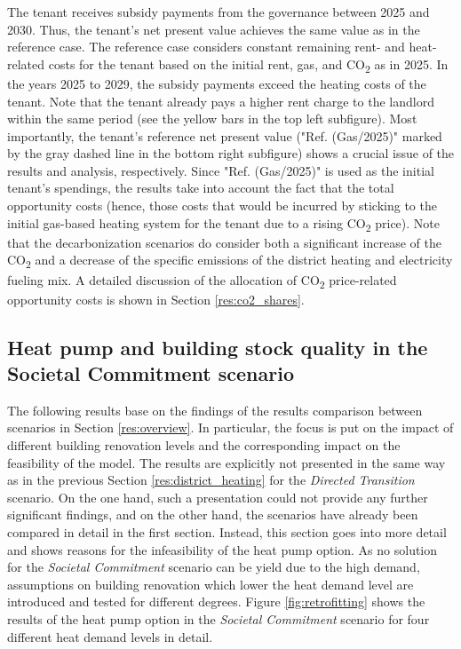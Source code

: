  The tenant receives subsidy payments from the governance between 2025 and 2030. Thus, the tenant's net present value achieves the same value as in the reference case. The reference case considers constant remaining rent- and heat-related costs for the tenant based on the initial rent, gas, and CO\textsubscript{2} as in 2025. In the years 2025 to 2029, the subsidy payments exceed the heating costs of the tenant. Note that the tenant already pays a higher rent charge to the landlord within the same period (see the yellow bars in the top left subfigure). Most importantly, the tenant's reference net present value ("Ref. (Gas/2025)" marked by the gray dashed line in the bottom right subfigure) shows a crucial issue of the results and analysis, respectively. Since "Ref. (Gas/2025)" is used as the initial tenant's spendings, the results take into account the fact that the total opportunity costs (hence, those costs that would be incurred by sticking to the initial gas-based heating system for the tenant due to a rising CO\textsubscript{2} price). Note that the decarbonization scenarios do consider both a significant increase of the CO\textsubscript{2} and a decrease of the specific emissions of the district heating and electricity fueling mix. A detailed discussion of the allocation of CO\textsubscript{2} price-related opportunity costs is shown in Section \ref{res:co2_shares}.

\subsection{Heat pump and building stock quality in the Societal Commitment scenario}\label{res:heat_pump}
The following results base on the findings of the results comparison between scenarios in Section \ref{res:overview}. In particular, the focus is put on the impact of different building renovation levels and the corresponding impact on the feasibility of the model. The results are explicitly not presented in the same way as in the previous Section \ref{res:district_heating} for the \textit{Directed Transition} scenario. On the one hand, such a presentation could not provide any further significant findings, and on the other hand, the scenarios have already been compared in detail in the first section. Instead, this section goes into more detail and shows reasons for the infeasibility of the heat pump option. As no solution for the \textit{Societal Commitment} scenario can be yield due to the high demand, assumptions on building renovation which lower the heat demand level are introduced and tested for different degrees.  Figure \ref{fig:retrofitting} shows the results of the heat pump option in the \textit{Societal Commitment} scenario for four different heat demand levels in detail. 

